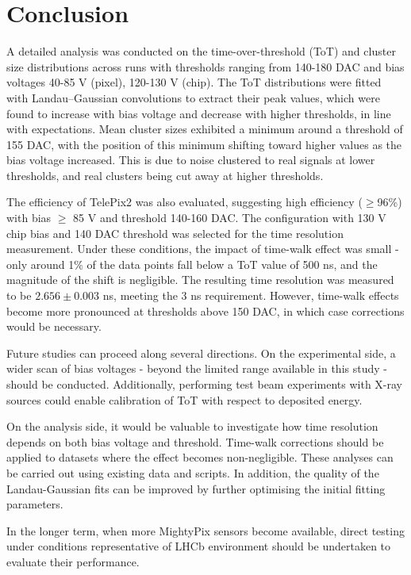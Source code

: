 
\chapter{Conclusion}
\label{section6}

A detailed analysis was conducted on the time-over-threshold (ToT) and cluster size distributions across runs with thresholds ranging from 140-180 DAC and bias voltages 40-85 V (pixel), 120-130 V (chip). The ToT distributions were fitted with Landau–Gaussian convolutions to extract their peak values, which were found to increase with bias voltage and decrease with higher thresholds, in line with expectations. Mean cluster sizes exhibited a minimum around a threshold of 155 DAC, with the position of this minimum shifting toward higher values as the bias voltage increased. This is due to noise clustered to real signals at lower thresholds, and real clusters being cut away at higher thresholds. %


The efficiency of TelePix2 was also evaluated, suggesting high efficiency ($\geq$96\%) with bias $\geq$ 85 V and threshold 140-160 DAC. The configuration with 130 V chip bias and 140 DAC threshold was selected for the time resolution measurement. Under these conditions, the impact of time-walk effect was small - only around 1\% of the data points fall below a ToT value of 500 ns, and the magnitude of the shift is negligible. The resulting time resolution was measured to be $2.656 \pm 0.003$ ns, meeting the 3 ns requirement. However, time-walk effects become more pronounced at thresholds above 150 DAC, in which case corrections would be necessary.


Future studies can proceed along several directions. On the experimental side, a wider scan of bias voltages - beyond the limited range available in this study - should be conducted. Additionally, performing test beam experiments with X-ray sources could enable calibration of ToT with respect to deposited energy. 


On the analysis side, it would be valuable to investigate how time resolution depends on both bias voltage and threshold. Time-walk corrections should be applied to datasets where the effect becomes non-negligible. These analyses can be carried out using existing data and scripts. In addition, the quality of the Landau-Gaussian fits can be improved by further optimising the initial fitting parameters. 

In the longer term, when more MightyPix sensors become available, direct testing under conditions representative of LHCb environment should be undertaken to evaluate their performance.
